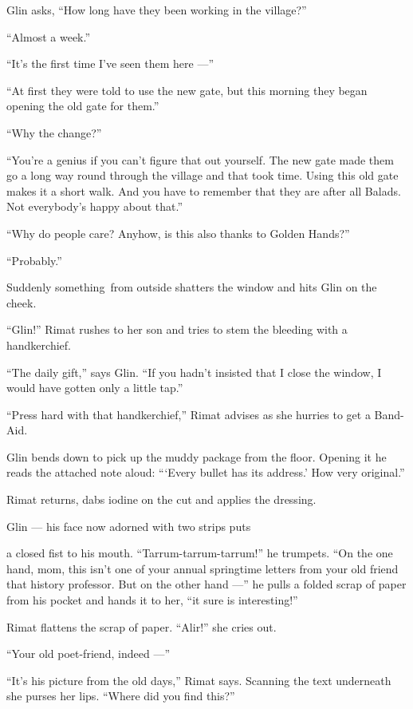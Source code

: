 \documentclass[twoside,11pt]{book}
\begin{document}
{Glin asks, ``How long have they been working in the village?''

{}``Almost a week.''

{}``It's the first time I've seen them here ---''

{{}``}At first{ they
were told to use the new gate, but this morning they began opening the old gate for them.'' }

{{}``Why}{ }{the
change?'' }

``You're a genius if you can't figure that out yourself. The new gate made them go a long way
round through the village and that took time.  Using this old gate makes it a short walk. And
you have to remember that they are after all Balads. Not everybody's happy about
that.''

``Why do people care? Anyhow, is this
also {thanks
to }Golden Hands?''

``Probably.''

Suddenly something~from outside shatters the window and hits Glin on
the cheek.

{}``Glin!'' Rimat rushes to her son and tries to stem the bleeding
with a handkerchief.

{{}``The daily gift,'' says Glin. ``If you hadn't
insisted }that {I close the window, I would have gotten only a
}little tap{.'' }

{{}``Press hard with }that
handkerchief,{{}'' Rimat advises as she hurries to get
a}{ }Band-Aid.

Glin bends down to pick up the muddy
package from the floor. Opening it he reads the attached note aloud:
``{\thinspace}`Every bullet has its address.' How very
original.''

{Rimat returns, dabs iodine on the cut and }applies the
dressing{. }

Glin --- his face now adorned with two strips
puts }a closed
fist {to his mouth. }{}``Tarrum-tarrum-tarrum!{}'' he trumpets. ``On
the one hand, mom,{ this isn't one of your annual springtime
letters from your old friend that}{ }{history
professor. But on the other hand ---'' he pulls a folded scrap of paper from his pocket and hands it
to }her,{ ``it sure is interesting!{}'' }

Rimat flattens the scrap of paper. ``Alir!'' she cries out.

{}``Your old poet-friend, indeed ---''

{}``It's his picture from the old days,{}'' Rimat says. Scanning the
text underneath she purses her lips. ``Where did you find this?{}''
\end{document}
